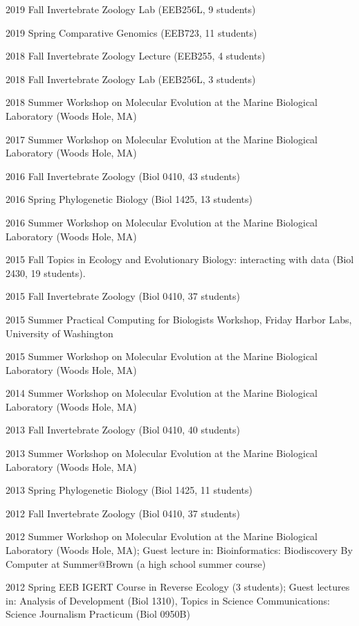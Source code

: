\begin{entry}{60pt}
\item [\rm 2019 Fall] Invertebrate Zoology Lab (EEB256L, 9 students)
\item [\rm 2019 Spring] Comparative Genomics (EEB723, 11 students)
\item [\rm 2018 Fall] Invertebrate Zoology Lecture (EEB255, 4 students)
\item [\rm 2018 Fall] Invertebrate Zoology Lab  (EEB256L, 3 students)
\item [\rm 2018 Summer] Workshop on Molecular Evolution at the Marine Biological Laboratory (Woods Hole, MA)
\item [\rm 2017 Summer] Workshop on Molecular Evolution at the Marine Biological Laboratory (Woods Hole, MA)
\item [\rm 2016 Fall] Invertebrate Zoology (Biol 0410, 43 students)
\item [\rm 2016 Spring] Phylogenetic Biology (Biol 1425, 13 students)
\item [\rm 2016 Summer] Workshop on Molecular Evolution at the Marine Biological Laboratory (Woods Hole, MA)
\item [\rm 2015 Fall] Topics in Ecology and Evolutionary Biology: interacting with data (Biol 2430, 19 students).
\item [\rm 2015 Fall] Invertebrate Zoology (Biol 0410, 37 students)
\item [\rm 2015 Summer] Practical Computing for Biologists Workshop, Friday Harbor Labs, University of Washington
\item [\rm 2015 Summer] Workshop on Molecular Evolution at the Marine Biological Laboratory (Woods Hole, MA)
\item [\rm 2014 Summer] Workshop on Molecular Evolution at the Marine Biological Laboratory (Woods Hole, MA)
\item [\rm 2013 Fall] Invertebrate Zoology (Biol 0410, 40 students)
\item [\rm 2013 Summer] Workshop on Molecular Evolution at the Marine Biological Laboratory (Woods Hole, MA)
\item [\rm 2013 Spring] Phylogenetic Biology (Biol 1425, 11 students)
\item [\rm 2012 Fall] Invertebrate Zoology (Biol 0410, 37 students)
\item [\rm 2012 Summer] Workshop on Molecular Evolution at the Marine Biological Laboratory (Woods Hole, MA); Guest lecture in: Bioinformatics: Biodiscovery By Computer at Summer@Brown (a high school summer course)
\item [\rm 2012 Spring] EEB IGERT Course in Reverse Ecology (3 students); Guest lectures in: Analysis of Development (Biol 1310), Topics in Science Communications: Science Journalism Practicum (Biol 0950B)

\end{entry}
